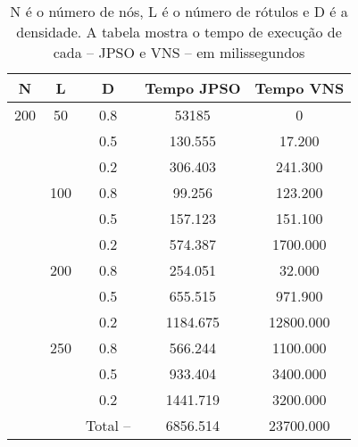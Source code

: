 \documentclass{sig-alternate-05-2015}
\begin{document}
\begin{table}
	
	
	\begin{tabular}{ccccc}
		\hline \rule[-2ex]{0pt}{5.5ex} N & L & D  & Tempo JPSO & Tempo VNS  \\ 
		\hline \rule[-2ex]{0pt}{5.5ex} 200 & 50 & 0.8 & 53185 & 0 \\ 
		\rule[-2ex]{0pt}{5.5ex}  &  & 0.5 &  130.555 &17.200\\ 
		\rule[-2ex]{0pt}{5.5ex}  &  & 0.2 &  306.403 &241.300\\ 
		\rule[-2ex]{0pt}{5.5ex}  & 100 & 0.8 &99.256 &123.200\\ 
		\rule[-2ex]{0pt}{5.5ex}  &  & 0.5 &157.123 & 151.100\\ 
		\rule[-2ex]{0pt}{5.5ex}  &  & 0.2 & 574.387 &1700.000\\ 
		\rule[-2ex]{0pt}{5.5ex}  & 200 & 0.8 & 254.051 &32.000\\ 
		\rule[-2ex]{0pt}{5.5ex}  &  & 0.5 & 655.515 &971.900\\ 
		\rule[-2ex]{0pt}{5.5ex}  &  & 0.2 & 1184.675 &12800.000\\ 
		\rule[-2ex]{0pt}{5.5ex}  & 250 & 0.8 & 566.244 &1100.000\\ 
		\rule[-2ex]{0pt}{5.5ex}  &  & 0.5 & 933.404 &3400.000\\ 
		\rule[-2ex]{0pt}{5.5ex}  &  & 0.2 & 1441.719 &3200.000\\ 
		\hline \rule[-2ex]{0pt}{5.5ex}  &  & Total --  & 6856.514 & 23700.000\\ 
		\hline 
	\end{tabular} 
	\caption{N é o número de nós, L é o número de rótulos e D é a densidade.  A tabela mostra o tempo de execução de cada -- JPSO e VNS -- em milissegundos}
	\label{tab6}
\end{table}
\end{document}

